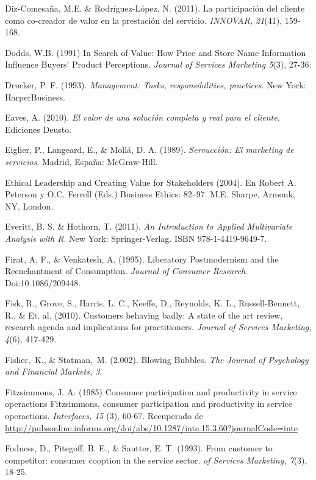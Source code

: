 \begin{thebibliography}{11}
	\bibitem{}
		Diz-Comesaña, M.E. \& Rodríguez-López, N. (2011). La participación del cliente como co-creador de valor en la prestación del servicio.  \emph{INNOVAR, 21}(41), 159-168.

	\bibitem{}
		Dodds, W.B. (1991) In Search of Value: How Price and Store Name Information Influence Buyers’ Product Perceptions. \emph{Journal of Services Marketing 5}(3), 27-36.

	\bibitem{}
		Drucker, P. F. (1993). \emph{Management: Tasks, responsibilities, practices}. New York: HarperBusiness. 

	\bibitem{}
		Eaves, A. (2010). \emph{El valor de una solución completa y real para el cliente}. Ediciones Deusto.

	\bibitem{}
		Eiglier, P., Langeard, E., \& Mollá, D. A. (1989). \emph{Servucción: El marketing de servicios}. Madrid, España: McGraw-Hill. 

	\bibitem{}
		Ethical Leadership and Creating Value for Stakeholders (2004). En Robert A. Peterson y O.C. Ferrell (Eds.) Business Ethics: 82–97. M.E. Sharpe, Armonk, NY, London.

	\bibitem{}
		Everitt, B. S. \& Hothorn, T. (2011). \emph{An Introduction to Applied Multivariate Analysis with R}. New York: Springer-Verlag. ISBN 978-1-4419-9649-7.

	\bibitem{}
		Firat, A. F., \& Venkatesh, A. (1995). Liberatory Postmodernism and the Reenchantment of Consumption. \emph{Journal of Consumer Research}. Doi:10.1086/209448.

	\bibitem{}
		Fisk, R., Grove, S., Harris, L. C., Keeffe, D., Reynolds, K. L., Russell-Bennett, R., \& Et. al. (2010). Customers behaving badly: A state of the art review, research agenda and implications for practitioners. \emph{Journal of Services Marketing, 4}(6), 417-429.

	\bibitem{}
		Fisher, K., \& Statman, M. (2.002). Blowing Bubbles. \emph{The Journal of Psychology and Financial Markets, 3}.

	\bibitem{}
		Fitzsimmons, J. A. (1985) Consumer participation and productivity in service operactions Fitzsimmons, consumer participation and productivity in service operactions. \emph{Interfaces, 15} (3), 60-67. Recuperado de \url{http://pubsonline.informs.org/doi/abs/10.1287/inte.15.3.60?journalCode=inte}

	\bibitem{}
		Fodness, D., Pitegoff, B. E., \& Sautter, E. T. (1993). From customer to competitor: consumer cooption in the service sector. \emph{of Services Marketing, 7}(3), 18-25.  		


\end{thebibliography}
